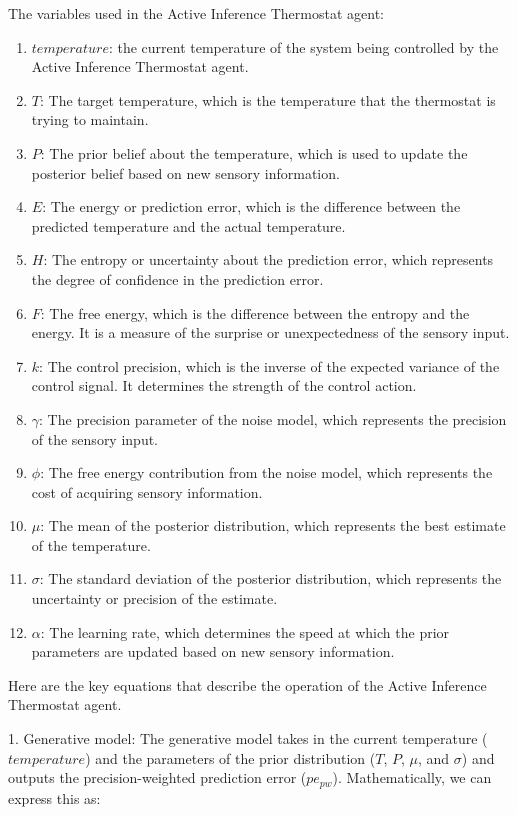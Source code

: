 \documentclass{article}
\begin{document}
The variables used in the Active Inference Thermostat agent:

\begin{enumerate}
	\item $temperature$: the current temperature of the system being controlled by the Active Inference Thermostat agent.
	\item $T$: The target temperature, which is the temperature that the thermostat is trying to maintain.
	\item $P$: The prior belief about the temperature, which is used to update the posterior belief based on new sensory information.
	\item $E$: The energy or prediction error, which is the difference between the predicted temperature and the actual temperature.
	\item $H$: The entropy or uncertainty about the prediction error, which represents the degree of confidence in the prediction error.
	\item $F$: The free energy, which is the difference between the entropy and the energy. It is a measure of the surprise or unexpectedness of the sensory input.
	\item $k$: The control precision, which is the inverse of the expected variance of the control signal. It determines the strength of the control action.
	\item $\gamma$: The precision parameter of the noise model, which represents the precision of the sensory input.
	\item $\phi$: The free energy contribution from the noise model, which represents the cost of acquiring sensory information.
	\item $\mu$: The mean of the posterior distribution, which represents the best estimate of the temperature.
	\item $\sigma$: The standard deviation of the posterior distribution, which represents the uncertainty or precision of the estimate.
	\item $\alpha$: The learning rate, which determines the speed at which the prior parameters are updated based on new sensory information.
\end{enumerate}

Here are the key equations that describe the operation of the Active Inference Thermostat agent.

1. Generative model:
The generative model takes in the current temperature ($temperature$) and the parameters of the prior distribution ($T$, $P$, $\mu$, and $\sigma$) and outputs the precision-weighted prediction error ($pe_{pw}$). Mathematically, we can express this as:
\end{document}
